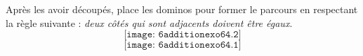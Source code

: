 Après les avoir découpés, place les dominos pour former le parcours
en respectant la règle suivante : {\em deux côtés qui sont adjacents
  doivent être égaux}.
\[\texttt{[image: 6additionexo64.2]}\]
\[\texttt{[image: 6additionexo64.1]}\]

